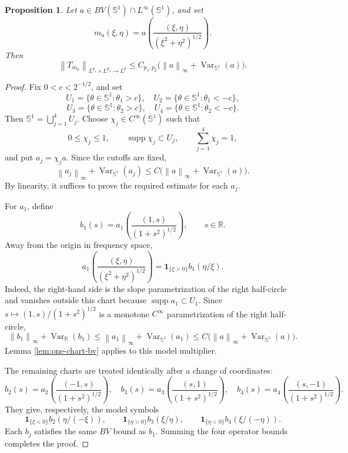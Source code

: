 \documentclass[11pt]{amsart}
\newtheorem{proposition}[definition]{Proposition}
\theoremstyle{remark}
\numberwithin{equation}{section}
\newcommand{\R}{\mathbb R}
\newcommand{\Sph}{\mathbb S^1}
\newcommand{\norm}[1]{\left\lVert #1\right\rVert}
\newcommand{\one}{\mathbf 1}
\newcommand{\Var}{\operatorname{Var}}
\begin{document}
	\begin{proposition}\label{prop:bv-angular}
		Let \(a\in BV(\Sph)\cap L^\infty(\Sph)\), and set
		\[
		m_a(\xi,\eta)=a\left(\frac{(\xi,\eta)}{(\xi^2+\eta^2)^{1/2}}\right).
		\]
		Then
		\[
		\norm{T_{m_a}}_{L^{p_1}\times L^{p_2}\to L^p}
		\le
		C_{p_1,p_2}\bigl(\norm a_\infty+\Var_{\Sph}(a)\bigr).
		\]
	\end{proposition}
	
	\begin{proof}
		Fix \(0<c<2^{-1/2}\), and set
		\[
		U_1=\{\theta\in \Sph:\theta_1>c\},\quad
		U_2=\{\theta\in \Sph:\theta_1<-c\},
		\]
		\[
		U_3=\{\theta\in \Sph:\theta_2>c\},\quad
		U_4=\{\theta\in \Sph:\theta_2<-c\}.
		\]
		Then \(\Sph=\bigcup_{j=1}^4U_j\).  Choose
		\(\chi_j\in C^\infty(\Sph)\) such that
		\[
		0\le\chi_j\le1,\qquad
		\operatorname{supp}\chi_j\subset U_j,\qquad
		\sum_{j=1}^4\chi_j=1,
		\]
		and put \(a_j=\chi_j a\).  Since the cutoffs are fixed,
		\[
		\norm{a_j}_\infty+\Var_{\Sph}(a_j)
		\le
		C\bigl(\norm a_\infty+\Var_{\Sph}(a)\bigr).
		\]
		By linearity, it suffices to prove the required estimate for each \(a_j\).
		
		For \(a_1\), define
		\[
		b_1(s)=a_1\left(\frac{(1,s)}{(1+s^2)^{1/2}}\right),
		\qquad s\in\R.
		\]
		Away from the origin in frequency space,
		\[
		a_1\left(\frac{(\xi,\eta)}{(\xi^2+\eta^2)^{1/2}}\right)
		=
		\one_{\{\xi>0\}}b_1(\eta/\xi).
		\]
		Indeed, the right-hand side is the slope parametrization of the right
		half-circle and vanishes outside this chart because
		\(\operatorname{supp}a_1\subset U_1\).  Since
		\(s\mapsto(1,s)/(1+s^2)^{1/2}\) is a monotone \(C^\infty\)
		parametrization of the right half-circle,
		\[
		\norm{b_1}_\infty+\Var_\R(b_1)
		\le
		\norm{a_1}_\infty+\Var_{\Sph}(a_1)
		\le
		C\bigl(\norm a_\infty+\Var_{\Sph}(a)\bigr).
		\]
		Lemma \ref{lem:one-chart-bv} applies to this model multiplier.
		
		The remaining charts are treated identically after a change of coordinates:
		\[
		b_2(s)=a_2\left(\frac{(-1,s)}{(1+s^2)^{1/2}}\right),\quad
		b_3(s)=a_3\left(\frac{(s,1)}{(1+s^2)^{1/2}}\right),\quad
		b_4(s)=a_4\left(\frac{(s,-1)}{(1+s^2)^{1/2}}\right).
		\]
		They give, respectively, the model symbols
		\[
		\one_{\{\xi<0\}}b_2(\eta/(-\xi)),\qquad
		\one_{\{\eta>0\}}b_3(\xi/\eta),\qquad
		\one_{\{\eta<0\}}b_4(\xi/(-\eta)).
		\]
		Each \(b_j\) satisfies the same \(BV\) bound as \(b_1\).  Summing the four
		operator bounds completes the proof.
	\end{proof}
	
\end{document}
